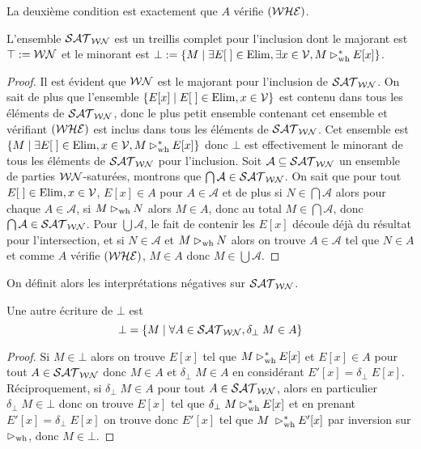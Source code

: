 \begin{rmk}
    La deuxième condition est exactement que $A$ vérifie $(\mathcal {WHE})$.
\end{rmk}

\begin{prop}
    L'ensemble $\mathcal {SAT}_{\mathcal{WN}}$ est un treillis complet pour l'inclusion dont le majorant est $\top := \mathcal {WN}$ et le minorant est $\bot := \{M\mid \exists E[\;]\in\mathrm{Elim},\exists x\in\mathcal V, M\rhd_{\mathrm{wh}}^* E[x]\}$.
\end{prop}

\begin{proof}
    Il est évident que $\mathcal {WN}$ est le majorant pour l'inclusion de $\mathcal {SAT}_{\mathcal{WN}}$. On sait de plus que l'ensemble $\{E[x]\mid E[\;]\in\mathrm{Elim},x\in\mathcal V\}$ est contenu dans tous les éléments de $\mathcal {SAT}_{\mathcal{WN}}$, donc le plus petit ensemble contenant cet ensemble et vérifiant $(\mathcal {WHE})$ est inclus dans tous les éléments de $\mathcal {SAT}_{\mathcal{WN}}$. Cet ensemble est $\{M\mid \exists E[\;]\in\mathrm{Elim},x\in\mathcal V,M\rhd_{\mathrm{wh}}^* E[x]\}$ donc $\bot$ est effectivement le minorant de tous les éléments de $\mathcal {SAT}_{\mathcal{WN}}$ pour l'inclusion. Soit $\mathcal A\subseteq \mathcal {SAT}_{\mathcal{WN}}$ un ensemble de parties $\mathcal {WN}$-saturées, montrons que $\bigcap\mathcal A\in\mathcal {SAT}_{\mathcal{WN}}$. On sait que pour tout $E[\;]\in\mathrm{Elim},x\in\mathcal V$, $E[x]\in A$ pour $A\in\mathcal A$ et de plus si $N\in\bigcap\mathcal A$ alors pour chaque $A\in\mathcal A$, si $M\rhd_{\mathrm{wh}} N$ alors $M\in A$, donc au total $M\in\bigcap\mathcal A$, donc $\bigcap\mathcal A\in\mathcal {SAT}_{\mathcal{WN}}$. Pour $\bigcup\mathcal A$, le fait de contenir les $E[x]$ découle déjà du résultat pour l'intersection, et si $N\in\mathcal A$ et $M\rhd_{\mathrm{wh}} N$ alors on trouve $A\in\mathcal A$ tel que $N\in A$ et comme $A$ vérifie $(\mathcal {WHE})$, $M\in A$ donc $M\in\bigcup\mathcal A$.
\end{proof}

On définit alors les interprétations négatives sur $\mathcal {SAT}_{\mathcal{WN}}$.

\begin{prop}
    Une autre écriture de $\bot$ est $$\bot = \{M\mid \forall A \in\mathcal {SAT}_{\mathcal{WN}}, \delta_\bot\;M\in A\}$$
\end{prop}

\begin{proof}
    Si $M\in\bot$ alors on trouve $E[x]$ tel que $M\rhd_{\mathrm{wh}}^* E[x]$ et $E[x]\in A$ pour tout $A\in\mathcal {SAT}_{\mathcal{WN}}$ donc $M\in A$ et $\delta_\bot\;M\in A$ en considérant $E'[x] = \delta_\bot\;E[x]$. Réciproquement, si $\delta_\bot\;M\in A$ pour tout $A\in\mathcal {SAT}_{\mathcal{WN}}$, alors en particulier $\delta_\bot\;M\in \bot$ donc on trouve $E[x]$ tel que $\delta_\bot\;M\rhd_{\mathrm{wh}}^* E[x]$ et en prenant $E'[x] = \delta_\bot\;E[x]$ on trouve donc $E'[x]$ tel que $M\;\rhd_{\mathrm{wh}}^* E'[x]$ par inversion sur $\rhd_{\mathrm{wh}}$, donc $M\in\bot$.
\end{proof}

